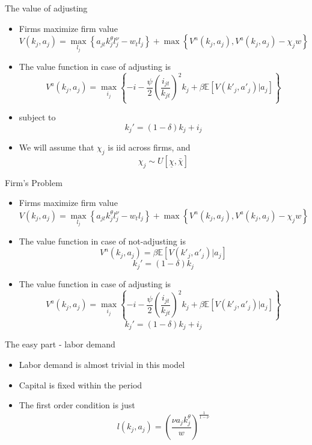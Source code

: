 \documentclass[11pt,aspectratio=169,xcolor={dvipsnames},hyperref={pdftex,pdfpagemode=UseNone,hidelinks,pdfdisplaydoctitle=true},usepdftitle=false]{beamer}
\begin{document}
\begin{frame}{The value of adjusting}
\begin{itemize}
\item Firms maximize firm value
$$V(k_j,a_j) = \max_{l_j} \left\lbrace a_{jt} k^{\theta}_{j} l_{j}^{\nu} - w_t l_{j} \right\rbrace + \max \left\lbrace V^n(k_j,a_j), V^a(k_j,a_j) - \chi_j w \right\rbrace $$
\item The value function in case of adjusting is
$$V^a(k_j,a_j) =\max_{i_j} \left\lbrace- i  - \frac{\psi}{2}\left(\frac{i_{jt}}{k_{jt}}\right)^2 k_{j} + \beta \mathbb{E} \left[ V(k'_j, a'_j) | a_j \right] \right\rbrace$$
\vspace{-0.5cm}
\item subject to
$$k_j' = (1-\delta) k_j + i_j $$
\pause
\item We will assume that $\chi_j$ is iid across firms, and
$$\chi_j \sim U[\underline{\chi},\bar{\chi}]$$
\end{itemize}
\end{frame}

\begin{frame}{Firm's Problem}
\begin{itemize}
\item Firms maximize firm value
$$V(k_j,a_j) = \max_{l_j} \left\lbrace a_{jt} k^{\theta}_{j} l_{j}^{\nu} - w_t l_{j} \right\rbrace + \max \left\lbrace V^n(k_j,a_j), V^a(k_j,a_j) - \chi_j w \right\rbrace $$
\item The value function in case of not-adjusting is
$$V^n(k_j,a_j) = \beta \mathbb{E} \left[ V(k'_j, a'_j) | a_j \right]$$
\vspace{-0.5cm}
$$k_j' = (1-\delta) k_j$$
\vspace{-0.5cm}
\item The value function in case of adjusting is
$$V^a(k_j,a_j) =\max_{i_j} \left\lbrace- i  - \frac{\psi}{2}\left(\frac{i_{jt}}{k_{jt}}\right)^2 k_{j} + \beta \mathbb{E} \left[ V(k'_j, a'_j) | a_j \right] \right\rbrace$$
\vspace{-0.5cm}
$$k_j' = (1-\delta) k_j + i_j $$
\vspace{-0.5cm}
\end{itemize}
\end{frame}

\begin{frame}{The easy part - labor demand}
\begin{itemize}
\item Labor demand is almost trivial in this model
\pause
\item Capital is fixed within the period
\pause
\item The first order condition is just
$$l(k_j,a_j) = \left(\frac{\nu a_j k_j^{\theta}}{w}\right)^{\frac{1}{1-\nu}} $$
\end{itemize}
\end{frame}
\end{document}
